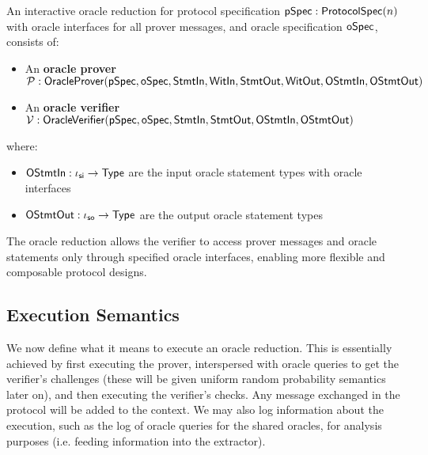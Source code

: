 \begin{definition}
    \label{def:interactive_oracle_reduction}
    An interactive oracle reduction for protocol specification $\mathsf{pSpec} : \mathsf{ProtocolSpec}(n)$ with oracle interfaces for all prover messages, and oracle specification $\mathsf{oSpec}$, consists of:
    \begin{itemize}
        \item An \textbf{oracle prover} $\mathcal{P} : \mathsf{OracleProver}(\mathsf{pSpec}, \mathsf{oSpec}, \mathsf{StmtIn}, \mathsf{WitIn}, \mathsf{StmtOut}, \mathsf{WitOut}, \mathsf{OStmtIn}, \mathsf{OStmtOut})$
        \item An \textbf{oracle verifier} $\mathcal{V} : \mathsf{OracleVerifier}(\mathsf{pSpec}, \mathsf{oSpec}, \mathsf{StmtIn}, \mathsf{StmtOut}, \mathsf{OStmtIn}, \mathsf{OStmtOut})$
    \end{itemize}

    where:
    \begin{itemize}
        \item $\mathsf{OStmtIn} : \iota_{\mathsf{si}} \to \mathsf{Type}$ are the input oracle statement types with oracle interfaces
        \item $\mathsf{OStmtOut} : \iota_{\mathsf{so}} \to \mathsf{Type}$ are the output oracle statement types
    \end{itemize}

    The oracle reduction allows the verifier to access prover messages and oracle statements only through specified oracle interfaces, enabling more flexible and composable protocol designs.
\end{definition}

\subsection{Execution Semantics}\label{sec:execution_semantics}

We now define what it means to execute an oracle reduction. This is essentially achieved by first
executing the prover, interspersed with oracle queries to get the verifier's challenges (these will
be given uniform random probability semantics later on), and then executing the verifier's checks.
Any message exchanged in the protocol will be added to the context. We may also log information
about the execution, such as the log of oracle queries for the shared oracles, for analysis purposes
(i.e. feeding information into the extractor).


